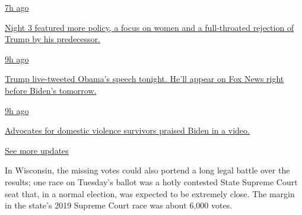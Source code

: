 \href{https://www.nytimes3xbfgragh.onion/live/2020/08/19/us/dnc-convention-election?action=click\&pgtype=Article\&state=default\&region=MAIN_CONTENT_1\&context=storylines_live_updates\#night-3-featured-more-policy-a-focus-on-women-and-a-full-throated-rejection-of-trump-by-his-predecessor}{7h
ago}

\href{https://www.nytimes3xbfgragh.onion/live/2020/08/19/us/dnc-convention-election?action=click\&pgtype=Article\&state=default\&region=MAIN_CONTENT_1\&context=storylines_live_updates\#night-3-featured-more-policy-a-focus-on-women-and-a-full-throated-rejection-of-trump-by-his-predecessor}{Night
3 featured more policy, a focus on women and a full-throated rejection
of Trump by his predecessor.}

\href{https://www.nytimes3xbfgragh.onion/live/2020/08/19/us/dnc-convention-election?action=click\&pgtype=Article\&state=default\&region=MAIN_CONTENT_1\&context=storylines_live_updates\#trump-live-tweeted-obamas-speech-tonight-hell-appear-on-fox-news-right-before-bidens-tomorrow}{9h
ago}

\href{https://www.nytimes3xbfgragh.onion/live/2020/08/19/us/dnc-convention-election?action=click\&pgtype=Article\&state=default\&region=MAIN_CONTENT_1\&context=storylines_live_updates\#trump-live-tweeted-obamas-speech-tonight-hell-appear-on-fox-news-right-before-bidens-tomorrow}{Trump
live-tweeted Obama's speech tonight. He'll appear on Fox News right
before Biden's tomorrow.}

\href{https://www.nytimes3xbfgragh.onion/live/2020/08/19/us/dnc-convention-election?action=click\&pgtype=Article\&state=default\&region=MAIN_CONTENT_1\&context=storylines_live_updates\#advocates-for-domestic-violence-survivors-praised-biden-in-a-video}{9h
ago}

\href{https://www.nytimes3xbfgragh.onion/live/2020/08/19/us/dnc-convention-election?action=click\&pgtype=Article\&state=default\&region=MAIN_CONTENT_1\&context=storylines_live_updates\#advocates-for-domestic-violence-survivors-praised-biden-in-a-video}{Advocates
for domestic violence survivors praised Biden in a video.}

\href{https://www.nytimes3xbfgragh.onion/live/2020/08/19/us/dnc-convention-election?action=click\&pgtype=Article\&state=default\&region=MAIN_CONTENT_1\&context=storylines_live_updates}{See
more updates}

In Wisconsin, the missing votes could also portend a long legal battle
over the results; one race on Tuesday's ballot was a hotly contested
State Supreme Court seat that, in a normal election, was expected to be
extremely close. The margin in the state's 2019 Supreme Court race was
about 6,000 votes.

